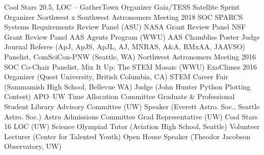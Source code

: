\documentclass{article}
\begin{document}
\begin{llist}
{\sc Cool Stars 20.5, LOC -- GatherTown Organizer}
{\sc Gaia/TESS Satellite Sprint Organizer}
{\sc Northwest x Southwest Astronomers Meeting 2018 SOC} 
{\sc SPARCS Systems Requirements Review Panel} (ASU) 
{\sc NASA Grant Review Panel}\location{}
{\sc NSF Grant Review Panel}\location{}
{\sc AAS Agents Program} (WWU) \location{}
{\sc AAS Chambliss Poster Judge}\location{}
{\sc Journal Referee (ApJ, ApJS, ApJL, AJ, MNRAS, A\&A, RMxAA, JAAVSO)}\location{}
{\sc Panelist}, ComSciCon-PNW (Seattle, WA) 
{\sc Northwest Astronomers Meeting 2016 SOC Co-Chair} 
{\sc Panelist}, Mix It Up: The STEM Mosaic (WWU) 
{\sc ExoClimes 2016 Organizer} (Quest University, British Columbia, CA) 
{\sc STEM Career Fair} (Sammamish High School, Bellevue WA) 
{\sc Judge (John Hunter Python Plotting Contest)} 
{\sc APO--UW Time Allocation Committee } 
{\sc Graduate \& Professional Student Library Advisory Committee (UW)} 
{\sc Speaker (Everett Astro. Soc.,  Seattle Astro. Soc.)}
{\sc Astro Admissions Committee Grad Representative (UW)} 
{\sc Cool Stars 16 LOC (UW)} 
{\sc Science Olympiad Tutor (Aviation High School, Seattle)} 
{\sc Volunteer Lecturer (Center for Talented Youth)} 
{\sc Open House Speaker (Theodor Jacobson Observatory, UW)} 













\end{llist}
\end{document}
